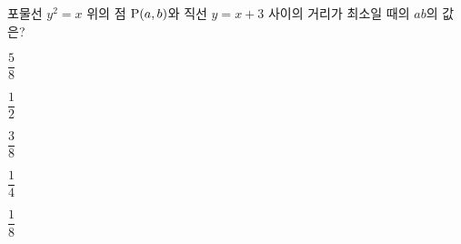 포물선 $y^2=x$ 위의 점 $\mathrm{P}(a{,}\mkern3mu\mathopen{}b)$와 직선 $y=x+3$ 사이의 거리가 최소일 때의 $ab$의 값은?
\begin{choices32}{\rule[-3ex]{0pt}{8ex}$\dfrac{5}{8}$}{\rule[-3ex]{0pt}{8ex}$\dfrac{1}{2}$}{\rule[-3ex]{0pt}{8ex}$\dfrac{3}{8}$}{\rule[-3ex]{0pt}{8ex}$\dfrac{1}{4}$}{\rule[-3ex]{0pt}{8ex}$\dfrac{1}{8}$}\end{choices32}
